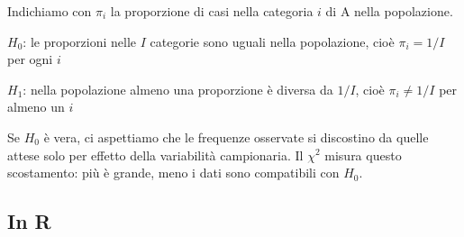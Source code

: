 \documentclass[
  ignorenonframetext,
  compress, aspectratio=149]{beamer}
\begin{document}
\begin{frame}{}
\label{section-8}
Indichiamo con \(\pi_i\) la proporzione di casi nella categoria \(i\) di
A nella popolazione.

\begin{tcolorbox}[enhanced jigsaw, opacitybacktitle=0.6, colframe=quarto-callout-note-color-frame, arc=.35mm, colbacktitle=quarto-callout-note-color!10!white, titlerule=0mm, breakable, colback=white, opacityback=0, coltitle=black, leftrule=.75mm, bottomtitle=1mm, toptitle=1mm, title={Sistema di ipotesi}, bottomrule=.15mm, rightrule=.15mm, toprule=.15mm, left=2mm]

\(H_0\): le proporzioni nelle \(I\) categorie sono uguali nella
popolazione, cioè \(\pi_i = 1/I\) per ogni \(i\)

\(H_1\): nella popolazione almeno una proporzione è diversa da \(1/I\),
cioè \(\pi_i \neq 1/I\) per almeno un \(i\)

\end{tcolorbox}

Se \(H_0\) è vera, ci aspettiamo che le frequenze osservate si
discostino da quelle attese solo per effetto della variabilità
campionaria. Il \(\chi^2\) misura questo scostamento: più è grande, meno
i dati sono compatibili con \(H_0\).
\end{frame}

\subsection{In R}\label{in-r-1}
\end{document}
